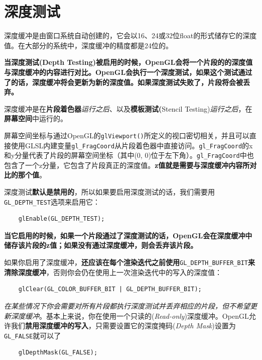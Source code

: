 \documentclass[UTF8,a4paper,12pt]{ctexbook}
\begin{document}
			
			
			
	\section{深度测试}
		深度缓冲是由窗口系统自动创建的，它会以16、24或32位float的形式储存它的深度值。在大部分的系统中，深度缓冲的精度都是24位的。
		
		\textbf{当深度测试(Depth Testing)被启用的时候，OpenGL会将一个片段的的深度值与深度缓冲的内容进行对比。OpenGL会执行一个深度测试，如果这个测试通过了的话，深度缓冲将会更新为新的深度值。如果深度测试失败了，片段将会被丢弃。}
	
		深度缓冲是在\textbf{片段着色器}\textit{运行之后}、以及\textbf{模板测试(}Stencil Testing)\textit{运行之后}，在\textbf{屏幕空间}中运行的。
		
		屏幕空间坐标与通过OpenGL的\verb|glViewport()|所定义的视口密切相关，并且可以直接使用GLSL内建变量\verb|gl_FragCoord|从片段着色器中直接访问。\verb|gl_FragCoord|的x和y分量代表了片段的屏幕空间坐标（其中(0, 0)位于左下角）。\verb|gl_FragCoord|中也包含了一个z分量，它包含了片段真正的深度值。\textbf{z值就是需要与深度缓冲内容所对比的那个值}。
		
		深度测试\textbf{默认是禁用的}，所以如果要启用深度测试的话，我们需要用\verb|GL_DEPTH_TEST|选项来启用它：
		\begin{lstlisting}
	glEnable(GL_DEPTH_TEST);
		\end{lstlisting}
		
		\textbf{当它启用的时候，如果一个片段通过了深度测试的话，OpenGL会在深度缓冲中储存该片段的z值；如果没有通过深度缓冲，则会丢弃该片段。}
		
		如果你启用了深度缓冲，\textbf{还应该在每个渲染迭代之前使用}\verb|GL_DEPTH_BUFFER_BIT|\textbf{来清除深度缓冲}，否则你会仍在使用上一次渲染迭代中的写入的深度值：
		
		\begin{lstlisting}
	glClear(GL_COLOR_BUFFER_BIT | GL_DEPTH_BUFFER_BIT);		
		\end{lstlisting}
		
		\textit{在某些情况下你会需要对所有片段都执行深度测试并丢弃相应的片段，但不希望更新深度缓冲}。基本上来说，你在使用一个只读的(\textit{Read-only})深度缓冲。OpenGL允许我们\textbf{禁用深度缓冲的写入}，只需要设置它的深度掩码(\textit{Depth Mask})设置为\verb|GL_FALSE|就可以了
		
		\begin{lstlisting}
	glDepthMask(GL_FALSE);		
		\end{lstlisting}
		
\end{document}
